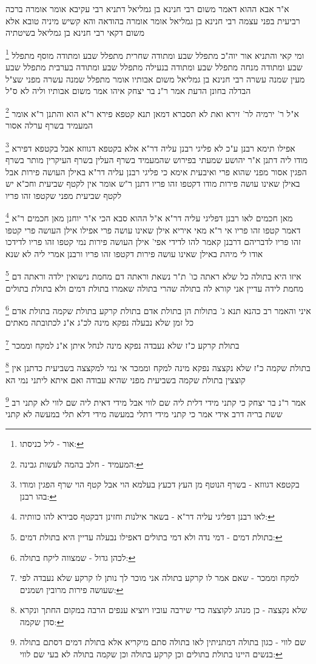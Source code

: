\documentclass[12pt, openany]{book}
\newcommand{\footnotecomment}[1]{
	\renewcommand\thefootnote{}
	\footnote{#1}}
\newcommand{\commenta}[1]{\footnotecomment{#1}}
\begin{document}
{א"ר אבא ההוא דאמר משום רבי חנינא בן גמליאל דתניא רבי עקיבא אומר אומרה ברכה רביעית בפני עצמה רבי חנינא בן גמליאל אומר אומרה בהודאה
והא קשיש מיניה טובא אלא משום דקאי רבי חנינא בן גמליאל בשיטתיה 
\commenta{אור - ליל כניסתו:}
ומי קאי והתניא אור יוה"כ מתפלל שבע ומתודה שחרית מתפלל שבע ומתודה מוסף מתפלל שבע ומתודה מנחה מתפלל שבע ומתודה בנעילה מתפלל שבע ומתודה בערבית מתפלל שבע מעין שמנה עשרה 
רבי חנינא בן גמליאל משום אבותיו אומר מתפלל שמנה עשרה מפני שצ"ל הבדלה בחונן הדעת אמר ר"נ בר יצחק איהו אמר משום אבותיו וליה לא ס"ל 
\commenta{המעמיד - חלב בהמה לעשות גבינה:}
א"ל ר' ירמיה לר' זירא ואת לא תסברא דמאן תנא קטפא פירא ר"א הוא והתנן ר"א אומר המעמיד בשרף ערלה אסור 
\commenta{בקטפא דגווזא - בשרף הנוטף מן העץ דכעץ בעלמא הוי אבל קטף הוי שרף הפגין ומודו בהו רבנן:}
אפילו תימא רבנן ע"כ לא פליגי רבנן עליה דר"א אלא בקטפא דגווזא אבל בקטפא דפירא מודו ליה דתנן א"ר יהושע שמעתי בפירוש שהמעמיד בשרף העלין בשרף העיקרין מותר בשרף הפגין אסור מפני שהוא פרי 
ואיבעית אימא כי פליגי רבנן עליה דר"א באילן העושה פירות אבל באילן שאינו עושה פירות מודו דקטפו זהו פריו דתנן ר"ש אומר אין לקטף שביעית וחכ"א יש לקטף שביעית מפני שקטפו זהו פריו 
\commenta{לאו רבנן דפליגי עליה דר"א - בשאר אילנות וחזינן דבקטף סבירא להו כוותיה:}
מאן חכמים לאו רבנן דפליגי עליה דר"א א"ל ההוא סבא הכי א"ר יוחנן מאן חכמים ר"א דאמר קטפו זהו פריו 
אי ר"א מאי איריא אילן שאינו עושה פרי אפילו אילן העושה פרי קטפו זהו פריו לדבריהם דרבנן קאמר להו לדידי אפי' אילן העושה פירות נמי קטפו זהו פריו לדידכו אודו לי מיהת באילן שאינו עושה פירות דקטפו זהו פריו ורבנן אמרי ליה לא שנא
\commenta{בתולת דמים - דמי נדה ולא דמי בתולים דאפילו נבעלה עדיין היא בתולת דמים:}
איזו היא בתולה כל שלא ראתה כו' ת"ר נשאת וראתה דם מחמת נישואין ילדה וראתה דם מחמת לידה עדיין אני קורא לה בתולה שהרי בתולה שאמרו בתולת דמים ולא בתולת בתולים 
\commenta{לכהן גדול - שמצווה ליקח בתולה:}
איני והאמר רב כהנא תנא ג' בתולות הן בתולת אדם בתולת קרקע בתולת שקמה בתולת אדם כל זמן שלא נבעלה נפקא מינה לכ"ג א"נ לכתובתה מאתים 
\commenta{למקח וממכר - שאם אמר לו קרקע בתולה אני מוכר לך נותן לו קרקע שלא נעבדה לפי שעושה פירות מרובין ושמנים:}
בתולת קרקע כ"ז שלא נעבדה נפקא מינה לנחל איתן א"נ למקח וממכר 
\commenta{שלא נקצצה - כן מנהג לקוצצה כדי שירבה עוביו ויוציא ענפים הרבה במקום החתך ונקרא סדן שקמה:}
בתולת שקמה כ"ז שלא נקצצה נפקא מינה למקח וממכר אי נמי למקצצה בשביעית כדתנן אין קוצצין בתולת שקמה בשביעית מפני שהיא עבודה ואם איתא ליתני נמי הא 
\commenta{שם לווי - כגון בתולה דמתניתין לאו בתולה סתם מיקריא אלא בתולת דמים דסתם בתולה בנשים היינו בתולת בתולים וכן קרקע בתולה וכן שקמה בתולה לא בעי שם לווי:}
אמר ר"נ בר יצחק כי קתני מידי דלית ליה שם לווי אבל מידי דאית ליה שם לווי לא קתני רב ששת בריה דרב אידי אמר כי קתני מידי דתלי במעשה מידי דלא תלי במעשה לא קתני 
}
\end{document}
